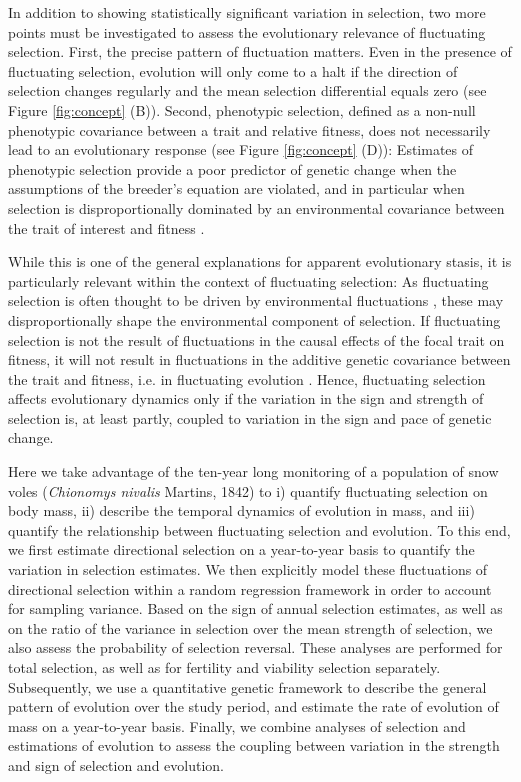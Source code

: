 In addition to showing statistically significant variation in selection, two more points must be investigated to assess the evolutionary relevance of fluctuating selection. First, the precise pattern of fluctuation matters. Even in the presence of fluctuating selection, evolution will only come to a halt if the direction of selection changes regularly and the mean selection differential equals zero \parencite{Blanckenhorn2000, Hunt2004a, Morrissey2012flusel} (see Figure \ref{fig:concept} (B)). Second, phenotypic selection, defined as a non-null phenotypic covariance between a trait and relative fitness, does not necessarily lead to an evolutionary response \parencite{Rausher1992} (see Figure \ref{fig:concept} (D)): Estimates of phenotypic selection provide a poor predictor of genetic change when the assumptions of the breeder's equation are violated, and in particular when selection is disproportionally dominated by an environmental covariance between the trait of interest and fitness \parencite{Price1989,Rausher1992,Bonnet2016}.

While this is one of the general explanations for apparent evolutionary stasis, it is particularly relevant within the context of fluctuating selection: As fluctuating selection is often thought to be driven by environmental fluctuations \parencite{Bell2010a, Chevin2014}, these may disproportionally shape the environmental component of selection. If fluctuating selection is not the result of fluctuations in the causal effects of the focal trait on fitness, it will not result in fluctuations in the additive genetic covariance between the trait and fitness, i.e. in fluctuating evolution \parencite{Robertson1966, Price1970, Morrissey2012sts}. Hence, fluctuating selection affects evolutionary dynamics only if the variation in the sign and strength of selection is, at least partly, coupled to variation in the sign and pace of genetic change.

Here we take advantage of the ten-year long monitoring of a population of snow voles (\textit{Chionomys nivalis} Martins, 1842) to i) quantify fluctuating selection on body mass, ii) describe the temporal dynamics of evolution in mass, and iii) quantify the relationship between fluctuating selection and evolution. To this end, we first estimate directional selection on a year-to-year basis to quantify the variation in selection estimates. We then explicitly model these fluctuations of directional selection within a random regression framework in order to account for sampling variance. Based on the sign of annual selection estimates, as well as on the ratio of the variance in selection over the mean strength of selection, we also assess the probability of selection reversal. These analyses are performed for total selection, as well as for fertility and viability selection separately. 
Subsequently, we use a quantitative genetic framework to describe the general pattern of evolution over the study period, and estimate the rate of evolution of mass on a year-to-year basis. 
Finally, we combine analyses of selection and estimations of evolution to assess the coupling between variation in the strength and sign of selection and evolution.


